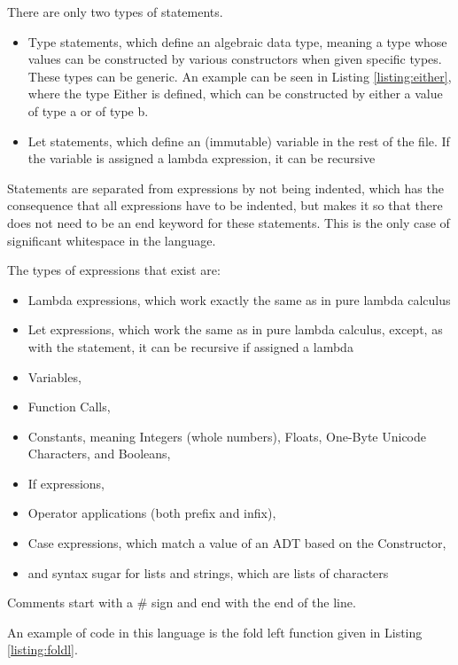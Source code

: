 \documentclass[12pt]{article}
\begin{document}
There are only two types of statements.
\begin{itemize}
      \item Type statements, which define an algebraic data type,
            meaning a type whose values can be constructed by various
            constructors when given specific types.
            These types can be generic.
            An example can be seen in Listing \ref{listing:either}, where the type Either is defined,
            which can be constructed by either a value of type a or of type b.
      \item Let statements, which define an (immutable) variable
            in the rest of the file. If the variable is assigned a
            lambda expression, it can be recursive
\end{itemize}
Statements are separated from expressions by not being indented,
which has the consequence that all expressions have to be indented,
but makes it so that there does not need to be an end keyword
for these statements.
This is the only case of significant whitespace in the language.

The types of expressions that exist are:
\begin{itemize}
      \item Lambda expressions, which work exactly
            the same as in pure lambda calculus
      \item Let expressions, which work the same as in pure
            lambda calculus, except, as with the statement,
            it can be recursive if assigned a lambda
      \item Variables,
      \item Function Calls,
      \item Constants, meaning Integers (whole numbers), Floats,
            One-Byte Unicode Characters, and Booleans,
      \item If expressions,
      \item Operator applications (both prefix and infix),
      \item Case expressions, which match a value of an ADT
            based on the Constructor,
      \item and syntax sugar for lists and strings,
            which are lists of characters
\end{itemize}

Comments start with a $\#$ sign and end with the end of the line.

An example of code in this language is the fold left function
given in Listing \ref{listing:foldl}.
\end{document}
